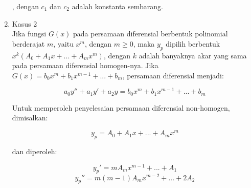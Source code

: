 \begin{enumerate}[1.]
	, dengan \begin{math} c_1 \end{math} dan \begin{math} c_2 \end{math} adalah konstanta sembarang. \\

	\item Kasus 2 \\

	Jika fungsi \begin{math} G(x) \end{math} pada persamaan diferensial berbentuk polinomial berderajat \begin{math} m \end{math}, yaitu \begin{math} x^{m} \end{math}, dengan \begin{math} m \geq 0 \end{math}, maka \begin{math} y_p \end{math} dipilih berbentuk \begin{math} x^{k} (A_0 + A_1 x + ... + A_m x^{m}) \end{math}, dengan \begin{math} k \end{math} adalah banyaknya akar yang sama pada persamaan diferensial homogen-nya. Jika \begin{math} G(x) = b_0 x^{m} + b_1 x^{m - 1} + ... + b_m \end{math}, persamaan diferensial menjadi:

	\begin{equation} a_0 y'' + a_1 y' + a_2 y = b_0 x^{m} + b_1 x^{m - 1} + ... + b_m \end{equation}

	Untuk memperoleh penyelesaian persamaan diferensial non-homogen, dimisalkan:

	\begin{displaymath} y_p = A_0 + A_1 x + ... + A_m x^{m} \end{displaymath}
		
	dan diperoleh:

	\begin{equation} y_p' = m A_m x^{m - 1} + ... + A_1 \end{equation} 
	\begin{equation} y_p'' = m (m - 1) A_m x^{m - 2} + ... + 2 A_2 \end{equation}


\end{enumerate}
